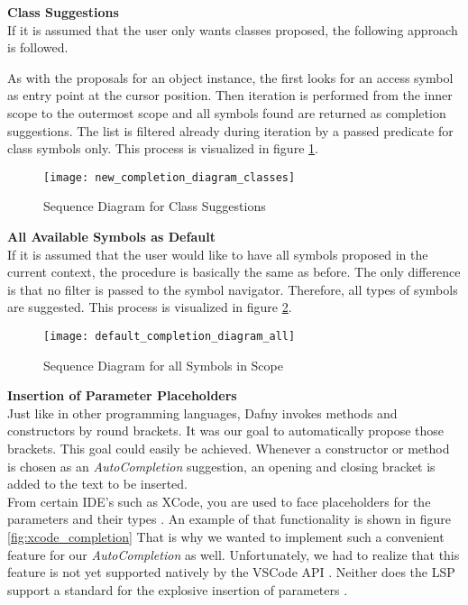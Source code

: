 \textbf{Class Suggestions}\\
If it is assumed that the user only wants classes proposed, the following approach is followed.

As with the proposals for an object instance,
the  first looks for an access symbol as entry point at the cursor position.
Then iteration is performed from the inner scope
to the outermost scope and all symbols found are returned as completion suggestions.
The list is filtered already during iteration by a passed predicate for class symbols only.
This process is visualized in figure \ref{fig:new_completion_diagram_classes}.

\begin{figure}[H]
    \centering
    \texttt{[image: new\_completion\_diagram\_classes]}
    \caption{Sequence Diagram for Class Suggestions}
    \label{fig:new_completion_diagram_classes}
\end{figure}

\textbf{All Available Symbols as Default}\\
If it is assumed that the user would like to have all symbols proposed in the current context,
the procedure is basically the same as before.
The only difference is that no filter is passed to the symbol navigator.
Therefore, all types of symbols are suggested.
This process is visualized in figure \ref{fig:default_completion_diagram_all}.

\begin{figure}[H]
    \centering
    \texttt{[image: default\_completion\_diagram\_all]}
    \caption{Sequence Diagram for all Symbols in Scope}
    \label{fig:default_completion_diagram_all}
\end{figure}

\textbf{Insertion of Parameter Placeholders}\\
Just like in other programming languages, Dafny invokes methods and constructors by round brackets.
It was our goal to automatically propose those brackets.
This goal could easily be achieved.
Whenever a constructor or method is chosen as an \textit{AutoCompletion} suggestion,
an opening and closing bracket is added to the text to be inserted. \\

From certain IDE's such as XCode,
you are used to face placeholders for the parameters and their types \cite{sa}.
An example of that functionality is shown in figure \ref{fig:xcode_completion}
That is why we wanted to implement such a convenient feature for our \textit{AutoCompletion} as well.
Unfortunately, we had to realize that this feature is not yet supported natively by the VSCode API \cite{vscodeAPI}.
Neither does the LSP support a standard for the explosive insertion of parameters \cite{lspspec}.

